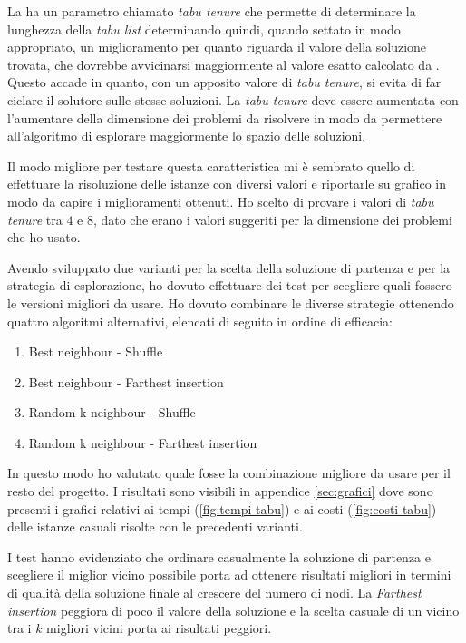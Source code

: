 La \tabu ha un parametro chiamato \emph{tabu tenure} che permette di determinare la lunghezza della \emph{tabu list} determinando quindi, quando settato in modo appropriato, un miglioramento per quanto riguarda il valore della soluzione trovata, che dovrebbe avvicinarsi maggiormente al valore esatto calcolato da .
Questo accade in quanto, con un apposito valore di \emph{tabu tenure}, si evita di far ciclare il solutore sulle stesse soluzioni.
La \emph{tabu tenure} deve essere aumentata con l'aumentare della dimensione dei problemi da risolvere in modo da permettere all'algoritmo di esplorare maggiormente lo spazio delle soluzioni.

Il modo migliore per testare questa caratteristica mi è sembrato quello di effettuare la risoluzione delle istanze con diversi valori e riportarle su grafico in modo da capire i miglioramenti ottenuti.
Ho scelto di provare i valori di \emph{tabu tenure} tra $4$ e $8$, dato che erano i valori suggeriti per la dimensione dei problemi che ho usato.

Avendo sviluppato due varianti per la scelta della soluzione di partenza e per la strategia di esplorazione, ho dovuto effettuare dei test per scegliere quali fossero le versioni migliori da usare.
Ho dovuto combinare le diverse strategie ottenendo quattro algoritmi alternativi, elencati di seguito in ordine di efficacia:
\begin{enumerate}
	\item Best neighbour - Shuffle
	\item Best neighbour - Farthest insertion 
	\item Random k neighbour - Shuffle
	\item Random k neighbour - Farthest insertion
\end{enumerate}
In questo modo ho valutato quale fosse la combinazione migliore da usare per il resto del progetto.
I risultati sono visibili in appendice \ref{sec:grafici} dove sono presenti i grafici relativi ai tempi (\ref{fig:tempi tabu}) e ai costi (\ref{fig:costi tabu}) delle istanze casuali risolte con le precedenti varianti.

I test hanno evidenziato che ordinare casualmente la soluzione di partenza e scegliere il miglior vicino possibile porta ad ottenere risultati migliori in termini di qualità della soluzione finale al crescere del numero di nodi.
La \emph{Farthest insertion} peggiora di poco il valore della soluzione e la scelta casuale di un vicino tra i $k$ migliori vicini porta ai risultati peggiori.

